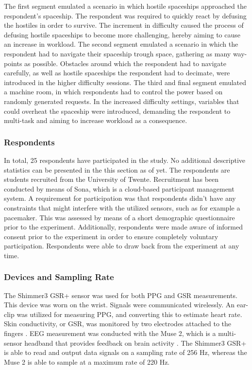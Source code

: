 \documentclass[12pt]{article}
\begin{document}
The first segment emulated a scenario in which hostile spaceships approached the respondent's spaceship. The respondent was required to quickly react by defusing the hostiles in order to survive. The increment in difficulty caused the process of defusing hostile spaceships to become more challenging, hereby aiming to cause an increase in workload. The second segment emulated a scenario in which the respondent had to navigate their spaceship trough space, gathering as many way-points as possible. Obstacles around which the respondent had to navigate carefully, as well as hostile spaceships the respondent had to decimate, were introduced in the higher difficulty sessions. The third and final segment emulated a machine room, in which respondents had to control the power based on randomly generated requests. In the increased difficulty settings, variables that could overheat the spaceship were introduced, demanding the respondent to multi-task and aiming to increase workload as a consequence.

\subsubsection{Respondents}
In total, 25 respondents have participated in the study. No additional descriptive statistics can be presented in the this section as of yet. The respondents are students recruited from the University of Twente. Recruitment has been conducted by means of Sona, which is a cloud-based participant management system. A requirement for participation was that respondents didn't have any constraints that might interfere with the utilized sensors, such as for example a pacemaker. This was assessed by means of a short demographic questionnaire prior to the experiment. Additionally, respondents were made aware of informed consent prior to the experiment in order to ensure completely voluntary participation. Respondents were able to draw back from the experiment at any time. 

\subsubsection{Devices and Sampling Rate}
The Shimmer3 GSR+ sensor was used for both PPG and GSR measurements. This device was worn on the wrist. Signals were communicated wirelessly. An ear-clip was utilized for measuring PPG, and converting this to estimate heart rate. Skin conductivity, or GSR, was monitored by two electrodes attached to the fingers \cite{shimmer}. EEG measurement was conducted with the Muse 2, which is a multi-sensor headband that provides feedback on brain activity \cite{muse}. The Shimmer3 GSR+ is able to read and output data signals on a sampling rate of 256 Hz, whereas the Muse 2 is able to sample at a maximum rate of 220 Hz. 
\end{document}
